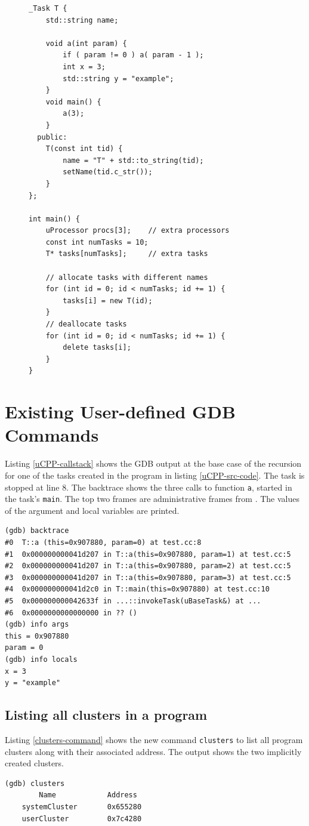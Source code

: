 \begin{figure}
\begin{lstlisting}[style=C++, caption={\uCPPS source code used for GDB commands},
label={uCPP-src-code}, basicstyle=\small]
_Task T {
    std::string name;

    void a(int param) {
        if ( param != 0 ) a( param - 1 );
        int x = 3;
        std::string y = "example";
    }
    void main() {
        a(3);
    }
  public:
    T(const int tid) {
        name = "T" + std::to_string(tid);
        setName(tid.c_str());
    }
};

int main() {
    uProcessor procs[3];	// extra processors
    const int numTasks = 10;
    T* tasks[numTasks];		// extra tasks

    // allocate tasks with different names
    for (int id = 0; id < numTasks; id += 1) {
        tasks[i] = new T(id);
    }
    // deallocate tasks
    for (int id = 0; id < numTasks; id += 1) {
        delete tasks[i];
    }
}
\end{lstlisting}
\end{figure}

\section{Existing User-defined GDB Commands}
Listing \ref{uCPP-callstack} shows the GDB output at the base case of the
recursion for one of the tasks created in the \uCPPS program in listing
\ref{uCPP-src-code}.  The task is stopped at line 8. The backtrace shows the
three calls to function \verb|a|, started in the task's \verb|main|. The top
two frames are administrative frames from \uCPP. The values of the argument and
local variables are printed.
\begin{lstlisting}[caption={Call stack of function \texttt{a} in the \uCPPS
program from listing \ref{uCPP-src-code}}, label={uCPP-callstack}, basicstyle=\small\tt]
(gdb) backtrace
#0  T::a (this=0x907880, param=0) at test.cc:8
#1  0x000000000041d207 in T::a(this=0x907880, param=1) at test.cc:5
#2  0x000000000041d207 in T::a(this=0x907880, param=2) at test.cc:5
#3  0x000000000041d207 in T::a(this=0x907880, param=3) at test.cc:5
#4  0x000000000041d2c0 in T::main(this=0x907880) at test.cc:10
#5  0x000000000042633f in ...::invokeTask(uBaseTask&) at ...
#6  0x0000000000000000 in ?? ()
(gdb) info args
this = 0x907880
param = 0
(gdb) info locals
x = 3
y = "example"
\end{lstlisting}

\subsection{Listing all clusters in a \uCPPS program}
Listing \ref{clusters-command} shows the new command \verb|clusters| to list
all program clusters along with their associated address.  The output shows the
two \uCPPS implicitly created clusters.
\begin{lstlisting}[caption={clusters command}, label={clusters-command}, basicstyle=\small\tt]
(gdb) clusters
        Name            Address
    systemCluster       0x655280
    userCluster         0x7c4280
\end{lstlisting}

